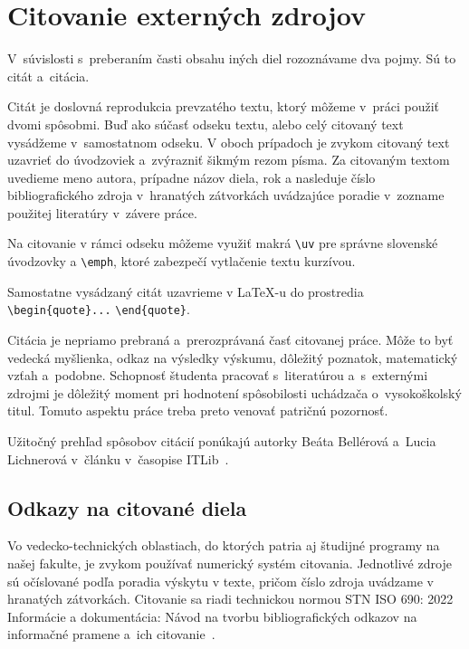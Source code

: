 \chapter{Citovanie externých zdrojov}\label{sec:citation}
V~súvislosti s~preberaním časti obsahu iných diel
rozoznávame dva pojmy. Sú to citát a~citácia.

Citát je doslovná reprodukcia prevzatého textu,
ktorý môžeme v~práci použiť dvomi spôsobmi.
Buď ako súčasť odseku textu,
alebo celý citovaný text vysádžeme v~samostatnom odseku.
V oboch prípadoch je zvykom citovaný text uzavrieť do úvodzoviek
a~zvýrazniť šikmým rezom písma.
Za citovaným textom uvedieme meno autora,
prípadne názov diela, rok a nasleduje číslo bibliografického
zdroja v~hranatých zátvorkách uvádzajúce poradie
v~zozname použitej literatúry v~závere práce.

Na citovanie v rámci odseku môžeme využiť makrá \verb|\uv| pre
správne slovenské úvodzovky a \verb|\emph|,
ktoré zabezpečí vytlačenie textu kurzívou.

Samostatne vysádzaný citát uzavrieme v \LaTeX-u do prostredia
\verb|\begin{quote}...| \verb|\end{quote}|.

Citácia je nepriamo prebraná a~prerozprávaná
časť citovanej práce.
Môže to byť vedecká myšlienka, odkaz na výsledky výskumu,
dôležitý poznatok, matematický vzťah a~podobne.
Schopnosť študenta pracovať s~literatúrou a~s~externými zdrojmi
je dôležitý moment pri hodnotení spôsobilosti uchádzača
o~vysokoškolský titul.
Tomuto aspektu práce treba preto venovať patričnú pozornosť.

Užitočný prehľad spôsobov citácií ponúkajú autorky
Beáta Bellérová a~Lucia Lichnerová v~článku v~časopise ITLib~\cite{Lichnerova2023Nove}.

\section{Odkazy na citované diela}
Vo vedecko-technických oblastiach, do ktorých patria aj študijné programy na našej fakulte, je zvykom používať numerický systém citovania. Jednotlivé zdroje sú očíslované podľa poradia výskytu v texte, pričom číslo zdroja uvádzame v hranatých zátvorkách.
Citovanie sa riadi technickou normou STN ISO 690: 2022 Informácie a dokumentácia: Návod na tvorbu bibliografických odkazov na informačné pramene a~ich citovanie~\cite{iso690}.

